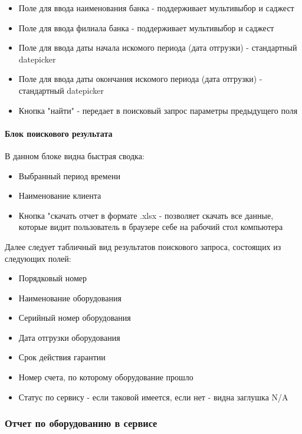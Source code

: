 \documentclass[DIV=calc, paper=a4, fontsize=11pt]{scrartcl} %
\begin{document}
\begin{itemize}
	\item Поле для ввода наименования банка - поддерживает мультивыбор и саджест
	\item Поле для ввода филиала банка - поддерживает мультивыбор и саджест
	\item Поле для ввода даты начала искомого периода (дата отгрузки) - стандартный datepicker
	\item Поле для ввода даты окончания искомого периода (дата отгрузки) - стандартный datepicker
	\item Кнопка "найти" - передает в поисковый запрос параметры предыдущего поля
\end{itemize}

\paragraph{Блок поискового результата}
В данном блоке видна быстрая сводка:

\begin{itemize}
	\item Выбранный период времени
	\item Наименование клиента
	\item Кнопка "скачать отчет в формате .xlsx - позволяет скачать все данные, которые видит пользователь в браузере себе на рабочий стол компьютера
\end{itemize}

Далее следует табличный вид результатов поискового запроса, состоящих из следующих полей:

\begin{itemize}
	\item Порядковый номер
	\item Наименование оборудования
	\item Серийный номер оборудования
	\item Дата отгрузки оборудования
	\item Срок действия гарантии
	\item Номер счета, по которому оборудование прошло
	\item Статус по сервису - если таковой имеется, если нет - видна заглушка N/A
\end{itemize}

\subsubsection{Отчет по оборудованию в сервисе}
\end{document}
